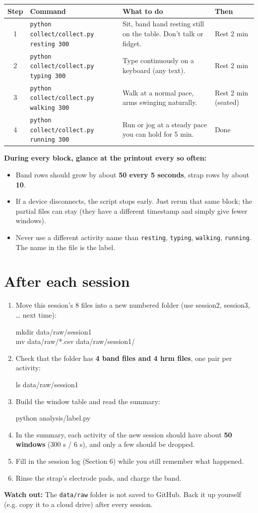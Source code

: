 \documentclass[11pt]{article}
\newcommand{\cmd}[1]{\par\smallskip\colorbox{black!6}{\parbox{\dimexpr\linewidth-2\fboxsep}{\ttfamily\small #1}}\par\smallskip}
\newcommand{\warn}[1]{\par{\color{warn}\textbf{Watch out:} #1}\par}
\begin{document}
\medskip
\renewcommand{\arraystretch}{1.35}
\begin{tabular}{@{}c >{\raggedright\arraybackslash}p{1.6in} >{\raggedright\arraybackslash}p{2.35in} >{\raggedright\arraybackslash}p{1.5in}@{}}
\toprule
\textbf{Step} & \textbf{Command} & \textbf{What to do} & \textbf{Then} \\
\midrule
1 & \texttt{python collect/collect.py resting 300} & Sit, band hand resting still on the table. Don't talk or fidget. & Rest 2 min \\
2 & \texttt{python collect/collect.py typing 300} & Type continuously on a keyboard (any text). & Rest 2 min \\
3 & \texttt{python collect/collect.py walking 300} & Walk at a normal pace, arms swinging naturally. & Rest 2 min (seated) \\
4 & \texttt{python collect/collect.py running 300} & Run or jog at a steady pace you can hold for 5 min. & Done \\
\bottomrule
\end{tabular}

\medskip
\textbf{During every block, glance at the printout every so often:}
\begin{itemize}
  \item Band rows should grow by about \textbf{50 every 5 seconds}, strap rows by about \textbf{10}.
  \item If a device disconnects, the script stops early. Just rerun that same block; the partial files can stay
        (they have a different timestamp and simply give fewer windows).
  \item Never use a different activity name than \texttt{resting}, \texttt{typing}, \texttt{walking},
        \texttt{running}. The name in the file is the label.
\end{itemize}

\section{After each session}
\begin{enumerate}[label=\arabic*.]
  \item Move this session's 8 files into a new numbered folder (use session2, session3, \ldots{} next time):
  \cmd{mkdir data/raw/session1\\mv data/raw/*.csv data/raw/session1/}
  \item Check that the folder has \textbf{4 band files and 4 hrm files}, one pair per activity:
  \cmd{ls data/raw/session1}
  \item Build the window table and read the summary:
  \cmd{python analysis/label.py}
  \item In the summary, each activity of the new session should have about \textbf{50 windows}
        (300 s / 6 s), and only a few should be dropped.
  \item Fill in the session log (Section 6) while you still remember what happened.
  \item Rinse the strap's electrode pads, and charge the band.
\end{enumerate}
\warn{The \texttt{data/raw} folder is not saved to GitHub. Back it up yourself (e.g. copy it to a cloud drive)
after every session.}
\end{document}
